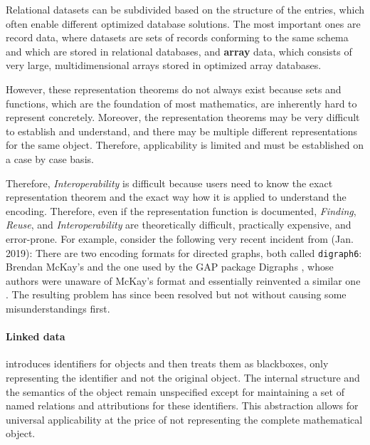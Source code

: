 Relational datasets can be subdivided based on the structure of the entries, which often enable different optimized database solutions.
The most important ones are record data, where datasets are sets of records conforming to the same schema and which are stored in relational databases, and \textbf{array} data, which consists of very large, multidimensional arrays stored in optimized array databases. %

However, these representation theorems do not always exist because sets and functions, which are the foundation of most mathematics, are inherently hard to represent concretely.
Moreover, the representation theorems may be very difficult to establish and understand, and there may be multiple different representations for the same object.
Therefore, applicability is limited and must be established on a case by case basis.

Therefore, \emph{Interoperability} is difficult because users need to know the exact representation theorem and the exact way how it is applied to understand the encoding.
Therefore, even if the representation function is documented, \emph{Finding}, \emph{Reuse}, and \emph{Interoperability} are theoretically difficult, practically expensive, and error-prone.
For example, consider the following very recent incident from (Jan. 2019): 
There are two encoding formats for directed graphs, both called \texttt{digraph6}: Brendan McKay's \cite{McKayFormats:on} and the one used by the GAP package Digraphs \cite{GAPDigraphFormat:on}, whose authors were unaware of McKay's format and essentially reinvented a similar one \cite{digraph6issue:on}.
The resulting problem has since been resolved but not without causing some misunderstandings first.

\paragraph{Linked data} introduces identifiers for objects and then treats them as blackboxes, only representing the identifier and not the original object.
The internal structure and the semantics of the object remain unspecified except for maintaining a set of named relations and attributions for these identifiers.
This abstraction allows for universal applicability at the price of not representing the complete mathematical object.


